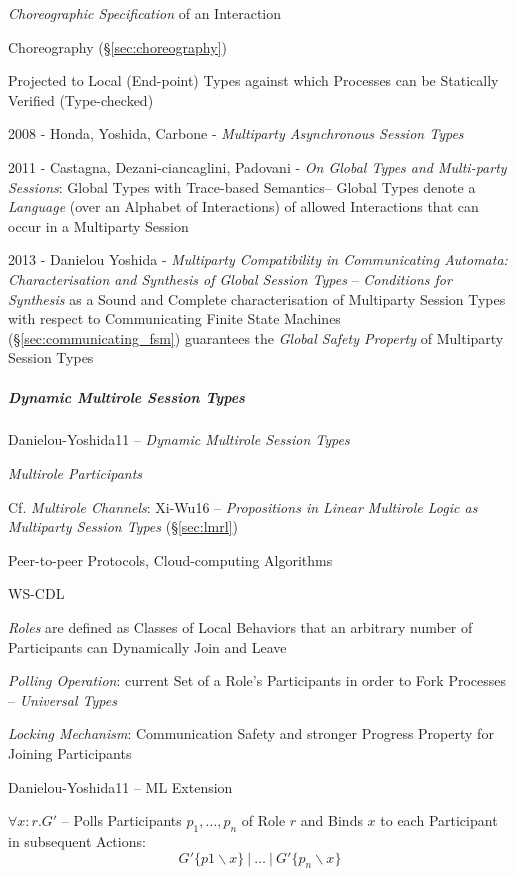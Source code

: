 \emph{Choreographic Specification} of an Interaction

\fist Choreography (\S\ref{sec:choreography})

Projected to Local (End-point) Types against which Processes can be
Statically Verified (Type-checked)

2008 - Honda, Yoshida, Carbone - \emph{Multiparty Asynchronous Session
  Types} \cite{honda-yoshida-carbone08}

2011 - Castagna, Dezani-ciancaglini, Padovani - \emph{On Global Types
  and Multi-party Sessions}: Global Types with Trace-based Semantics--
Global Types denote a \emph{Language} (over an Alphabet of
Interactions) of allowed Interactions that can occur in a Multiparty
Session

2013 - Danielou Yoshida - \emph{Multiparty Compatibility in
  Communicating Automata: Characterisation and Synthesis of Global
  Session Types} -- \emph{Conditions for Synthesis} as a Sound and
Complete characterisation of Multiparty Session Types with respect to
Communicating Finite State Machines (\S\ref{sec:communicating_fsm})
guarantees the \emph{Global Safety Property} of Multiparty Session
Types



\subparagraph{Dynamic Multirole Session Types}
\label{sec:multirole_session}\hfill

Danielou-Yoshida11 -- \emph{Dynamic Multirole Session Types}

\emph{Multirole Participants}

\fist Cf. \emph{Multirole Channels}: Xi-Wu16 -- \emph{Propositions in
  Linear Multirole Logic as Multiparty Session Types}
(\S\ref{sec:lmrl})

Peer-to-peer Protocols, Cloud-computing Algorithms

WS-CDL

\emph{Roles} are defined as Classes of Local Behaviors that an
arbitrary number of Participants can Dynamically Join and Leave

\emph{Polling Operation}: current Set of a Role's Participants in
order to Fork Processes -- \emph{Universal Types}

\emph{Locking Mechanism}: Communication Safety and stronger Progress
Property for Joining Participants

Danielou-Yoshida11 -- ML Extension

$\forall x : r.G'$ -- Polls Participants $p_1, \ldots, p_n$ of Role
$r$ and Binds $x$ to each Participant in subsequent Actions:
\[
  G' \{ p1 \backslash x \} \ |\ \ldots \ |\ G' \{ p_n \backslash x \}
\]

